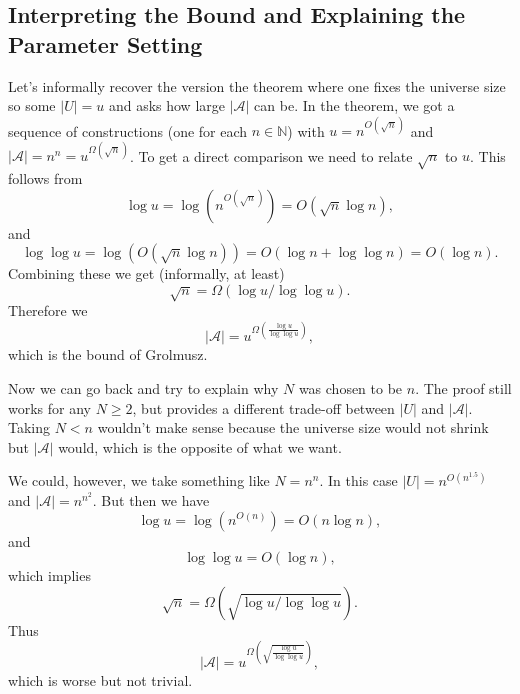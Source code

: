 \documentclass[12pt]{article}
\def\N{{\mathbb N}}
\newcommand{\calA}{\mathcal{A}}
\begin{document}
\subsection{Interpreting the Bound and Explaining the Parameter Setting}

Let's informally recover the version the theorem where one fixes the universe
size so some $|U| = u$ and asks how large $|\calA|$ can be. In the theorem,
we got a sequence of constructions (one for each $n\in\N$) with
$u = n^{O(\sqrt{n})}$ and $|\calA| = n^n = u^{\Omega(\sqrt{n})}$. To get
a direct comparison we need to relate $\sqrt{n}$ to $u$. This follows
from
\[
  \log u = \log\left(n^{O(\sqrt{n})}\right)
  = O(\sqrt{n}\log n),
\]
and
\[
  \log\log u = \log\left(O(\sqrt{n}\log n)\right)
  = O(\log n + \log\log n) = O(\log n).
\]
Combining these we get (informally, at least)
\[
  \sqrt{n} = \Omega(\log u / \log \log u).
\]
Therefore we 
\[
  |\calA| = u^{\Omega\left(\frac{\log u}{\log \log u}\right)},
\]
which is the bound of Grolmusz.


Now we can go back and try to explain why $N$ was chosen to be $n$.  The proof
still works for any $N \geq 2$, but provides a different trade-off between $|U|$
and $|\calA|$. Taking $N < n$ wouldn't make sense because the universe size
would not shrink but $|\calA|$ would, which is the opposite of what we want.

We could, however, we take something like $N = n^n$. In this case $|U| =
n^{O(n^{1.5})}$ and $|\calA| = n^{n^2}$. 
But then we have
\[
  \log u = \log\left(n^{O(n)}\right) = O(n\log n),
\]
and
\[
  \log \log u = O(\log n),
\]
which implies
\[
  \sqrt{n} = \Omega(\sqrt{\log u/\log \log u}).
\]
Thus 
\[
  |\calA| = u^{\Omega\left(\sqrt{\frac{\log u}{\log \log u}}\right)},
\]
which is worse but not trivial.
\end{document}
